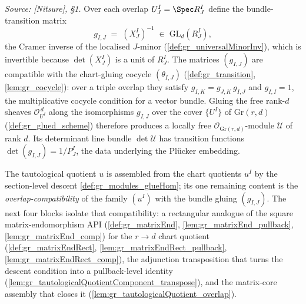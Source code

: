 \begin{definition}


  \label{def:gr_universal_quotient_sheaf}
  \textit{Source: [Nitsure], \S 1.}
  Over each overlap \(U^I_J = \Spec R^I_J\) define the bundle-transition matrix
  \[
    g_{I,J} \;=\; (X^I_J)^{-1} \;\in\; \mathrm{GL}_d(R^I_J),
  \]
  the Cramer inverse of the localised \(J\)-minor (\cref{def:gr_universalMinorInv}),
  which is invertible because \(\det(X^I_J)\) is a unit of \(R^I_J\). The matrices
  \((g_{I,J})\) are compatible with the chart-gluing cocycle \((\theta_{I,J})\)
  (\cref{def:gr_transition}, \cref{lem:gr_cocycle}): over a triple overlap they
  satisfy \(g_{I,K} = g_{J,K}\, g_{I,J}\) and \(g_{I,I} = 1\), the multiplicative
  cocycle condition for a vector bundle. Gluing the free rank-\(d\) sheaves
  \(\mathcal{O}_{U^I}^{\,d}\) along the isomorphisms \(g_{I,J}\) over the cover
  \(\{U^I\}\) of \(\mathrm{Gr}(r,d)\) (\cref{def:gr_glued_scheme}) therefore
  produces a locally free \(\mathcal{O}_{\mathrm{Gr}(r,d)}\)-module
  \(\mathcal{U}\) of rank \(d\). Its determinant line bundle \(\det \mathcal{U}\)
  has transition functions \(\det(g_{I,J}) = 1/P^I_J\), the data underlying the
  Pl\"ucker embedding.
\end{definition}

The tautological quotient \(u\) is assembled from the chart quotients \(u^I\) by the
section-level descent \cref{def:gr_modules_glueHom}; its one remaining content is the
\emph{overlap-compatibility} of the family \((u^I)\) with the bundle gluing
\((g_{I,J})\). The next four blocks isolate that compatibility: a rectangular analogue of
the square matrix-endomorphism API (\cref{def:gr_matrixEnd},
\cref{lem:gr_matrixEnd_pullback}, \cref{lem:gr_matrixEnd_comp}) for the
\(r \to d\) chart quotient (\cref{def:gr_matrixEndRect},
\cref{lem:gr_matrixEndRect_pullback}, \cref{lem:gr_matrixEndRect_comp}), the
adjunction transposition that turns the descent condition into a pullback-level identity
(\cref{lem:gr_tautologicalQuotientComponent_transpose}), and the matrix-core assembly
that closes it (\cref{lem:gr_tautologicalQuotient_overlap}).

